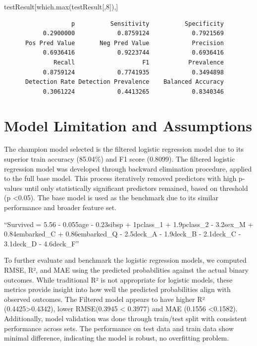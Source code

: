 \documentclass[
  letterpaper,
  DIV=11,
  numbers=noendperiod]{scrartcl}
\newenvironment{Shaded}{\begin{snugshade}}{\end{snugshade}}
\newcommand{\DecValTok}[1]{\textcolor[rgb]{0.68,0.00,0.00}{#1}}
\newcommand{\FunctionTok}[1]{\textcolor[rgb]{0.28,0.35,0.67}{#1}}
\newcommand{\NormalTok}[1]{\textcolor[rgb]{0.00,0.23,0.31}{#1}}
\begin{document}
\begin{Shaded}
\begin{Highlighting}[]
\NormalTok{testResult[}\FunctionTok{which.max}\NormalTok{(testResult[,}\DecValTok{8}\NormalTok{]),]}
\end{Highlighting}
\end{Shaded}

\begin{verbatim}
                   p          Sensitivity          Specificity 
           0.2900000            0.8759124            0.7921569 
      Pos Pred Value       Neg Pred Value            Precision 
           0.6936416            0.9223744            0.6936416 
              Recall                   F1           Prevalence 
           0.8759124            0.7741935            0.3494898 
      Detection Rate Detection Prevalence    Balanced Accuracy 
           0.3061224            0.4413265            0.8340346 
\end{verbatim}

\section{Model Limitation and
Assumptions}\label{model-limitation-and-assumptions}

The champion model selected is the filtered logistic regression model
due to its superior train accuracy (85.04\%) and F1 score (0.8099). The
filtered logistic regression model was developed through backward
elimination procedure, applied to the full base model. This process
iteratively removed predictors with high p-values until only
statistically significant predictors remained, based on threshold (p
\textless0.05). The base model is used as the benchmark due to its
similar performance and broader feature set.

``Survived = 5.56 - 0.055age - 0.23sibsp + 1pclass\_1 + 1.9pclass\_2 -
3.2sex\_M + 0.84embarked\_C + 0.86embarked\_Q - 2.5deck\_A - 1.9deck\_B
- 2.1deck\_C - 3.1deck\_D - 4.6deck\_F''

To further evaluate and benchmark the logistic regression models, we
computed RMSE, R², and MAE using the predicted probabilities against the
actual binary outcomes. While traditional R² is not appropriate for
logistic models, these metrics provide insight into how well the
predicted probabilities align with observed outcomes. The Filtered model
appears to have higher R² (0.4425\textgreater0.4342), lower RMSE(0.3945
\textless{} 0.3977) and MAE (0.1556 \textless0.1582). Additionally,
model validation was done through train/test split with consistent
performance across sets. The performance on test data and train data
show minimal difference, indicating the model is robust, no overfitting
problem.
\end{document}
